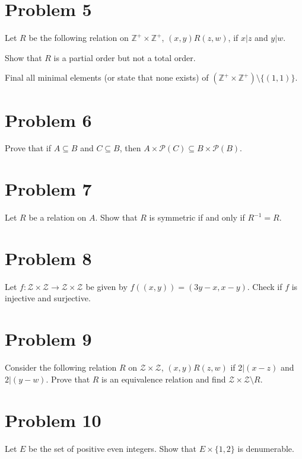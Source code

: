 \documentclass{article}
\begin{document}
    \section*{Problem 5}

    Let $R$ be the following relation on $\mathbb{Z}^+\times\mathbb{Z}^+$, $(x,y)R(z,w)$,
    if $x|z$ and $y|w$.

    Show that $R$ is a partial order but not a total order.

    Final all minimal elements (or state that none exists) of $(\mathbb{Z}^+\times\mathbb{Z}^+)
    \setminus \{(1,1)\}$.


    \section*{Problem 6}

    Prove that if $A\subseteq B$ and $C\subseteq B$, then $A\times\mathcal{P}(C)\subseteq B
    \times \mathcal{P}(B)$.


    \section*{Problem 7}

    Let $R$ be a relation on $A$. Show that $R$ is symmetric if and only if $R^{-1} = R$.


    \section*{Problem 8}
    
    Let $f:\mathcal{Z}\times\mathcal{Z}\rightarrow\mathcal{Z}\times\mathcal{Z}$ be given by 
    $f((x,y)) = (3y-x,x-y)$. Check if $f$ is injective and surjective.


    \section*{Problem 9}

    Consider the following relation $R$ on $\mathcal{Z}\times\mathcal{Z}$, $(x,y)R(z,w)$
    if $2|(x-z)$ and $2|(y-w)$. Prove that $R$ is an equivalence relation and find 
    $\mathcal{Z}\times\mathcal{Z}\setminus R$.


    \section*{Problem 10}

    Let $E$ be the set of positive even integers. Show that $E\times\{1,2\}$ is denumerable.
\end{document}
